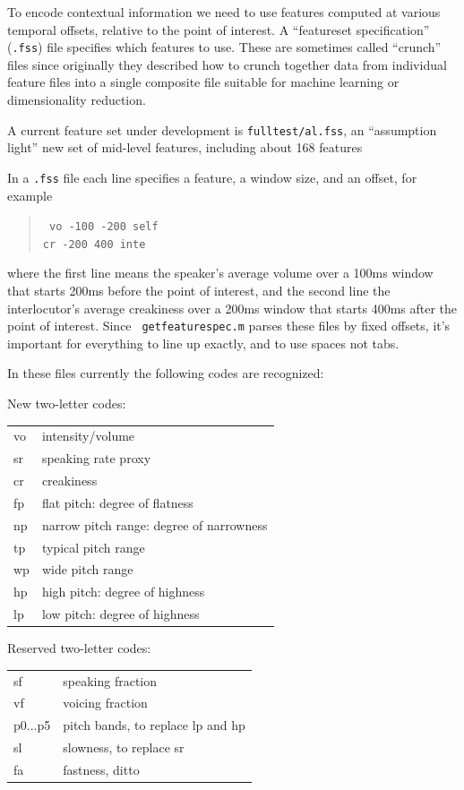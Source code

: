 \documentclass[11pt]{article}
\begin{document}
To encode contextual information we need to use features computed at
various temporal offsets, relative to the point of interest.  A
``featureset specification'' ({\tt .fss}) file specifies which
features to use.  These are sometimes called ``crunch'' files since
originally they described how to crunch together data from individual
feature files into a single composite file suitable for machine
learning or dimensionality reduction.


A current feature set under development is {\tt fulltest/al.fss}, an
``assumption light'' new set of mid-level features, including about
168 features

In a {\tt .fss} file each line specifies a feature, a window size, and
an offset, for example

\begin{quote}{\tt 
    vo   -100   -200 self  \\
    cr   -200    400 inte
}\end{quote}

where the first line means the speaker's average volume over a 100ms
window that starts 200ms before the point of interest, and the second
line the interlocutor's average creakiness over a 200ms window that
starts 400ms after the point of interest.  Since {\tt
  getfeaturespec.m} parses these files by fixed offsets, it's
important for everything to line up exactly, and to use spaces not
tabs.


In these files currently the following codes are recognized:

New two-letter codes: 

\begin{tabular}{ll}
  vo  & intensity/volume \\
  sr  & speaking rate proxy \\
  cr  & creakiness \\
  fp  & flat pitch: degree of flatness \\
  np  & narrow pitch range: degree of narrowness \\
  tp  & typical pitch range \\
  wp  & wide pitch range  \\
  hp  & high pitch: degree of highness \\ 
  lp  & low pitch: degree of highness \\
\end{tabular}

Reserved two-letter codes: 

\begin{tabular}{ll}  
  sf      & speaking fraction \\
  vf      & voicing fraction \\
  p0...p5 & pitch bands, to replace lp and hp  \\
  sl      & slowness, to replace sr \\
  fa      & fastness, ditto\\
\end{tabular}
\end{document}
